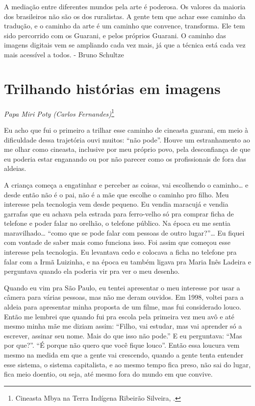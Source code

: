 {{A mediação entre diferentes mundos pela arte é poderosa. Os valores da
maioria dos brasileiros não são os dos ruralistas. A gente tem que
achar esse caminho da tradução, e o caminho da arte é um caminho que
convence, transforma. Ele tem sido percorrido com os Guarani, e pelos
próprios Guarani. O caminho das imagens digitais vem se ampliando cada
vez mais, já que a técnica está cada vez mais acessível a todos. -
Bruno Schultze 

\chapter{Trilhando histórias em imagens}
\begin{flushright}
\emph{Papa Miri Poty (Carlos Fernandes)}\footnote{Cineasta Mbya
na Terra Indígena Ribeirão Silveira, .}
\end{flushright}
\medskip

Eu acho que fui o primeiro a trilhar esse caminho de cineasta guarani,
em meio à dificuldade dessa trajetória ouvi muitos: ``não pode''. Houve
um estranhamento ao me olhar como cineasta, inclusive por meu próprio
povo, pela desconfiança de que eu poderia estar enganando ou por não
parecer como os profissionais de fora das aldeias.

A criança começa a engatinhar e perceber as coisas, vai escolhendo o
caminho\ldots{} e desde então não é o pai, não é a mãe que escolhe o caminho
pro filho. Meu interesse pela tecnologia vem desde pequeno. Eu vendia
maracujá e vendia garrafas que eu achava pela estrada para ferro-velho
só pra comprar ficha de telefone e poder falar no orelhão, o telefone
público. Na época eu me sentia maravilhado\ldots{} ``como que se pode falar
com pessoas de outro lugar?''\ldots{} Eu fiquei com vontade de saber mais
como funciona isso. Foi assim que começou esse interesse pela
tecnologia. Eu levantava cedo e colocava a ficha no telefone pra falar
com a Irmã Luizinha, e na época eu também ligava pra Maria Inês Ladeira
e perguntava quando ela poderia vir pra ver o meu desenho. 

Quando eu vim pra São Paulo, eu tentei apresentar o meu interesse por
usar a câmera para várias pessoas, mas não me deram ouvidos. Em 1998,
voltei para a aldeia para apresentar minha proposta de um filme, mas
fui considerado louco. Então me lembrei que quando fui pra escola pela
primeira vez meu avô e até mesmo minha mãe me diziam assim: ``Filho, vai
estudar, mas vai aprender só a escrever, assinar seu nome. Mais do que
isso não pode.'' E eu perguntava: ``Mas por que?''. ``É porque não quero
que você fique louco''. Então essa loucura vem mesmo na medida em que a
gente vai crescendo, quando a gente tenta entender esse sistema, o
sistema capitalista, e ao mesmo tempo fica preso, não sai do lugar,
fica meio doentio, ou seja, até mesmo fora do mundo em que convive. 

}}
